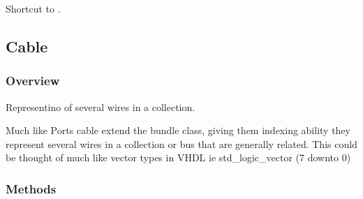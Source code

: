 \documentclass[letterpaper,10pt,english,openany,oneside]{sphinxmanual}
\begin{document}
\begin{fulllineitems}
\label{\detokenize{reference/classes/generated/spydrnet.OuterPin.get_hwires:spydrnet.OuterPin.get_hwires}}
Shortcut to {\hyperref[\detokenize{reference/classes/generated/spydrnet.get_hwires:spydrnet.get_hwires}]{}}.

\end{fulllineitems}



\subsection{Cable}
\label{\detokenize{reference/classes/cable:cable}}\label{\detokenize{reference/classes/cable:id1}}\label{\detokenize{reference/classes/cable::doc}}

\subsubsection{Overview}
\label{\detokenize{reference/classes/cable:overview}}

\begin{fulllineitems}
\label{\detokenize{reference/classes/cable:spydrnet.Cable}}
Representino of several wires in a collection.

Much like Ports cable extend the bundle class, giving them indexing ability they represent several wires in a collection or bus that are generally related.
This could be thought of much like vector types in VHDL ie std\_logic\_vector (7 downto 0)

\end{fulllineitems}



\subsubsection{Methods}
\label{\detokenize{reference/classes/cable:methods}}
\end{document}
